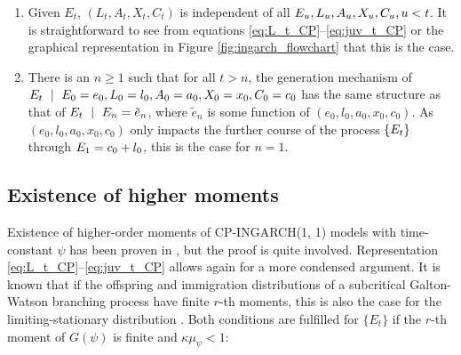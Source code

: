 \documentclass{article}
\begin{document}
\begin{enumerate}
\item Given $E_t$, $(L_t, A_t, X_t, C_t)$ is independent of all $E_u, L_u, A_u, X_u, C_u, u < t$. It is straightforward to see from equations \eqref{eq:L_t_CP}--\eqref{eq:juv_t_CP} or the graphical representation in Figure \ref{fig:ingarch_flowchart} that this is the case.
\item There is an $n \geq 1$ such that for all $t > n$, the generation mechanism of $\juv_t \ \mid \ \juv_0 = e_0, L_0 = l_0, A_0 = a_0, X_0 = x_0, C_0 = c_0$ has the same structure as that of $\juv_t \ \mid \ \juv_n = \tilde{e}_n$, where $\tilde{e}_n$ is some function of $(e_0, l_0, a_0, x_0, c_0)$. As $(e_0, l_0, a_0, x_0, c_0)$ only impacts the further course of the process $\{E_t\}$ through $E_1 = c_0 + l_0$, this is the case for $n = 1$. %
\end{enumerate}

\subsection{Existence of higher moments}

Existence of higher-order moments of CP-INGARCH(1, 1) models with time-constant $\psi$ has been proven in \cite{Silva2016}, but the proof is quite involved. Representation \eqref{eq:L_t_CP}--\eqref{eq:juv_t_CP} allows again for a more condensed argument. It is known that if the offspring and immigration distributions of a subcritical Galton-Watson branching process have finite $r$-th moments, this is also the case for the limiting-stationary distribution \cite[Sec. 4]{Lange1981}. Both conditions are fulfilled for $\{E_t\}$ if the $r$-th moment of $G(\psi)$ is finite and $\kappa\mu_\psi < 1$:
\end{document}
